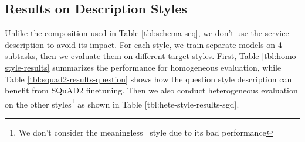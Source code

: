 \subsection{Results on Description Styles}
\label{ssec:desc-experiments}
Unlike the composition used in Table \ref{tbl:schema-seq}, we don't
use the service description to avoid its impact. For each style, we
train separate models on 4 subtasks, then we evaluate them on
different target styles. First, Table \ref{tbl:homo-style-results}
summarizes the performance for homogeneous evaluation, while Table
\ref{tbl:squad2-results-question} shows how the question style
description can benefit from SQuAD2 finetuning. Then we also conduct
heterogeneous evaluation on the other styles\footnote{We don't consider
  the meaningless \ID~style due to its bad performance} as shown in
Table \ref{tbl:hete-style-results-sgd}.
%
